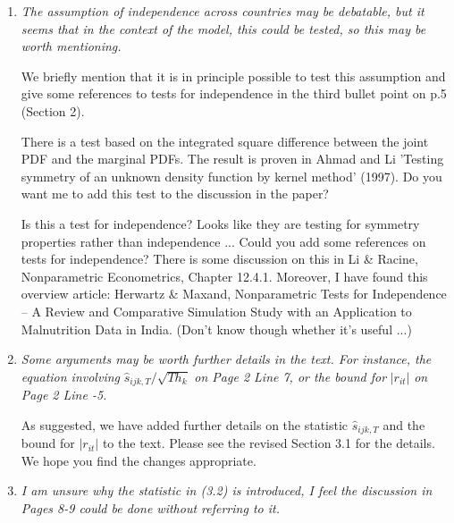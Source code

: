 \documentclass[a4paper,12pt]{article}
\begin{document}
\begin{enumerate}[label=(\arabic*),leftmargin=0.7cm]


\item \textit{The assumption of independence across countries may be debatable, but it seems that in the context of the model, this could be tested, so this may be worth mentioning.}

We briefly mention that it is in principle possible to test this assumption and give some references to tests for independence in the third bullet point on p.5 (Section 2).

{\color{red} There is a test based on the integrated square difference between the joint PDF and the marginal PDFs. The result is proven in Ahmad and Li 'Testing symmetry of an unknown density function by kernel method' (1997). Do you want me to add this test to the discussion in the paper?} 

{\color{blue} Is this a test for independence? Looks like they are testing for symmetry properties rather than independence ... Could you add some references on tests for independence? There is some discussion on this in Li \& Racine, Nonparametric Econometrics, Chapter 12.4.1. Moreover, I have found this overview article: Herwartz \& Maxand, Nonparametric Tests for Independence -- A Review and Comparative Simulation Study with an Application to Malnutrition Data in India. (Don't know though whether it's useful ...)}


\item \textit{Some arguments may be worth further details in the text. For instance, the equation involving} $\hat{s}_{ijk,T} / \sqrt{T h_k}$ \textit{on Page 2 Line 7, or the bound for} $|r_{it}|$ \textit{on Page 2 Line -5.}

As suggested, we have added further details on the statistic $\hat{s}_{ijk,T}$ and the bound for $|r_{it}|$ to the text. Please see the revised Section 3.1 for the details. We hope you find the changes appropriate.  


\item \textit{I am unsure why the statistic in (3.2) is introduced, I feel the discussion in Pages 8-9 could be done without referring to it.}


\end{enumerate}
\end{document}
